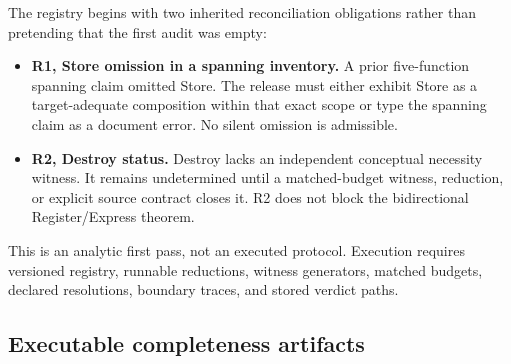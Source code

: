 \documentclass[11pt]{article}
\begin{document}
The registry begins with two inherited reconciliation obligations rather than pretending that the first audit was empty:
\begin{itemize}
\item \textbf{R1, Store omission in a spanning inventory.} A prior five-function spanning claim omitted Store. The release must either exhibit Store as a target-adequate composition within that exact scope or type the spanning claim as a document error. No silent omission is admissible.
\item \textbf{R2, Destroy status.} Destroy lacks an independent conceptual necessity witness. It remains undetermined until a matched-budget witness, reduction, or explicit source contract closes it. R2 does not block the bidirectional Register/Express theorem.
\end{itemize}
This is an analytic first pass, not an executed protocol. Execution requires versioned registry, runnable reductions, witness generators, matched budgets, declared resolutions, boundary traces, and stored verdict paths.

\subsection{Executable completeness artifacts}
\end{document}
